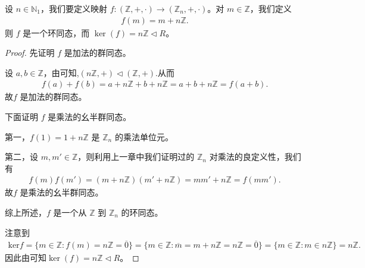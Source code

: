 \documentclass[../../main.tex]{subfiles}
\begin{document}
\begin{lemma}
设 $n \in \mathbb{N}_1$，我们要定义映射 $f : (\mathbb{Z}, +, \cdot) \to (\mathbb{Z}_n, +, \cdot)$。对 $m \in \mathbb{Z}$，我们定义
\begin{align*}
f(m) = m + n\mathbb{Z} .
\end{align*}
则 $f$ 是一个环同态，而 $\ker(f) = n\mathbb{Z} \lhd R$。
\end{lemma}
\begin{proof}
先证明 $f$ 是加法的群同态。

设 $a, b \in \mathbb{Z}$，由可知,$(n\mathbb{Z},+)\lhd(\mathbb{Z},+)$.从而
\begin{align*}
f(a)+f(b)=a+n\mathbb{Z}+b+n\mathbb{Z} = a+b+n\mathbb{Z}=f(a+b).
\end{align*}
故$f$ 是加法的群同态。

下面证明 $f$ 是乘法的幺半群同态。

第一，$f(1) = 1 + n\mathbb{Z}$ 是 $\mathbb{Z}_n$ 的乘法单位元。

第二，设 $m, m' \in \mathbb{Z}$，则利用上一章中我们证明过的 $\mathbb{Z}_n$ 对乘法的良定义性，我们有
\begin{align*}
f(m)f(m') = (m + n\mathbb{Z})(m' + n\mathbb{Z}) = mm' + n\mathbb{Z} = f(mm') .
\end{align*}
故$f$ 是乘法的幺半群同态。

综上所述，$f$ 是一个从 $\mathbb{Z}$ 到 $\mathbb{Z}_n$ 的环同态。 

注意到
\begin{align*}
\mathrm{ker}f=\{m\in \mathbb{Z} :f(m)=n\mathbb{Z} =\overline{0}\}=\{m\in \mathbb{Z} :\overline{m}=m+n\mathbb{Z} =n\mathbb{Z} =\overline{0}\}=\{m\in \mathbb{Z} :m\in n\mathbb{Z} \}=n\mathbb{Z} .
\end{align*}
因此由可知$\ker(f) = n\mathbb{Z} \lhd R$。
\end{proof}
\end{document}
